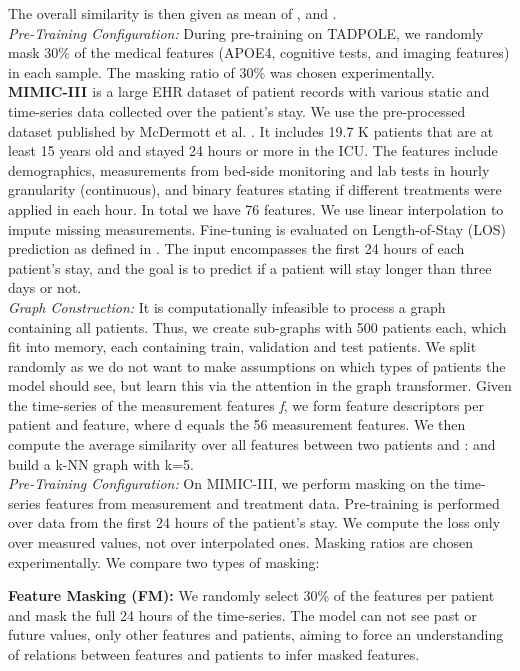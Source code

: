 \documentclass[runningheads]{llncs}
\begin{document}
The overall similarity  is then given as mean of ,  and .\\
\textit{Pre-Training Configuration:} During pre-training on TADPOLE, we randomly mask 30\% of the medical features (APOE4, cognitive tests, and imaging features) in each sample. The masking ratio of  30\% was chosen experimentally. \\
\textbf{MIMIC-III \cite{mimic}} is a large EHR dataset of patient records with various static and time-series data collected over the patient’s stay. We use the pre-processed dataset published by McDermott et al. \cite{mcdermott2021EHRbenchmark}. It includes 19.7 K patients that are at least 15 years old and stayed 24 hours or more in the ICU. The features include demographics, measurements from bed-side monitoring and lab tests in hourly granularity (continuous), and binary features stating if different treatments were applied in each hour. In total we have 76 features. We use linear interpolation to impute missing measurements. Fine-tuning is evaluated on  Length-of-Stay (LOS) prediction as defined in \cite{mcdermott2021EHRbenchmark}. The input encompasses the first 24 hours of each patient’s stay, and the goal is to predict if a patient will stay longer than three days or not.\\
\textit{Graph Construction:}
It is computationally infeasible to process a graph containing all patients. Thus, we create sub-graphs with 500 patients each, which fit into memory, each containing train, validation and test patients. We split randomly as we do not want to make assumptions on which types of patients the model should see, but learn this via the attention in the graph transformer. Given the time-series of the measurement features \textit{f}, we form feature descriptors  per patient and feature, where d equals the 56 measurement features. We then compute the average similarity over all features  between two patients  and : 
and build a k-NN graph with k=5.\\
\textit{Pre-Training Configuration:}
On MIMIC-III, we perform masking on the time-series features from measurement and treatment data. Pre-training is performed over data from the first 24 hours of the patient’s stay. We compute the loss only over measured values, not over interpolated ones. Masking ratios are chosen experimentally. We compare two types of masking:

\textbf{Feature Masking (FM):} We randomly select 30\% of the features per patient and mask the full 24 hours of the time-series. The model can not see past or future values, only other features and patients, aiming to force an understanding of relations between features and patients to infer masked features.
\end{document}
